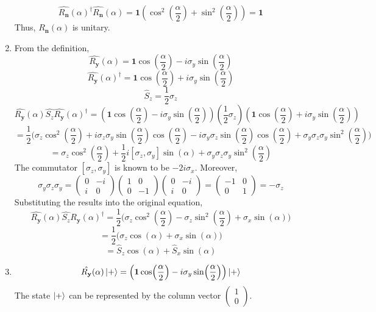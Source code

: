 \begin{sol}
\begin{enumerate}[label=\textbf{(\alph*)}]
$$\hat{R_\mathbf{n}}(\alpha)^\dagger\hat{R_\mathbf{n}}(\alpha)=\mathbf{1}(\cos^2(\frac{\alpha}{2})+\sin^2(\frac{\alpha}{2}))=\mathbf{1}$$ Thus, $\hat{R_\mathbf{n}}(\alpha)$ is unitary.
\item
From the definition, 
$$\hat{R_\mathbf{y}}(\alpha)=\mathbf{1}\cos(\frac{\alpha}{2})-i\sigma_y\sin(\frac{\alpha}{2})$$
$$\hat{R_\mathbf{y}}(\alpha)^\dagger=\mathbf{1}\cos(\frac{\alpha}{2})+i\sigma_y\sin(\frac{\alpha}{2})$$
$$\hat{S}_z=\frac{1}{2}\sigma_z$$ $$\hat{R_\mathbf{y}}(\alpha)\hat{S_z}\hat{R_\mathbf{y}}(\alpha)^\dagger=(\mathbf{1}\cos(\frac{\alpha}{2})-i\sigma_y\sin(\frac{\alpha}{2}))(\frac{1}{2}\sigma_z)(\mathbf{1}\cos(\frac{\alpha}{2})+i\sigma_y\sin(\frac{\alpha}{2}))$$ $$=\frac{1}{2}\Big(\sigma_z\cos^2(\frac{\alpha}{2})+i\sigma_z\sigma_y\sin(\frac{\alpha}{2})\cos(\frac{\alpha}{2})-i\sigma_y\sigma_z\sin(\frac{\alpha}{2})\cos(\frac{\alpha}{2})+\sigma_y\sigma_z\sigma_y\sin^2(\frac{\alpha}{2})\Big)$$
$$=\sigma_z\cos^2(\frac{\alpha}{2})+\frac{1}{2}i[\sigma_z,\sigma_y]\sin(\alpha)+\sigma_y\sigma_z\sigma_y\sin^2(\frac{\alpha}{2})$$
The commutator $[\sigma_z,\sigma_y]$ is known to be $-2i\sigma_x$. Moreover,
$$\sigma_y\sigma_z\sigma_y=\begin{pmatrix}0&-i\\i&0\end{pmatrix}\begin{pmatrix}1&0\\0&-1\end{pmatrix}\begin{pmatrix}0&-i\\i&0\end{pmatrix}=\begin{pmatrix}-1&0\\0&1\end{pmatrix}=-\sigma_z$$ 
Substituting the results into the original equation,
$$\hat{R_\mathbf{y}}(\alpha)\hat{S_z}\hat{R_\mathbf{y}}(\alpha)^\dagger=\frac{1}{2}\Big(\sigma_z\cos^2(\frac{\alpha}{2})-\sigma_z\sin^2(\frac{\alpha}{2})+\sigma_x\sin(\alpha)\Big)$$
$$=\frac{1}{2}\big(\sigma_z\cos(\alpha)+\sigma_x\sin(\alpha)\big)$$ $$=\hat S_z\cos(\alpha)+\hat S_x\sin(\alpha)$$  
\item
$$\hat{R_\mathbf{y}}(\alpha)\ket{+}=\Big(\mathbf{1}\cos(\frac{\alpha}{2})-i\sigma_y\sin(\frac{\alpha}{2})\Big)\ket{+}$$ 
The state $\ket{+}$ can be represented by the column vector $\begin{pmatrix}1\\0\end{pmatrix}$.

\end{enumerate}
\end{sol}
